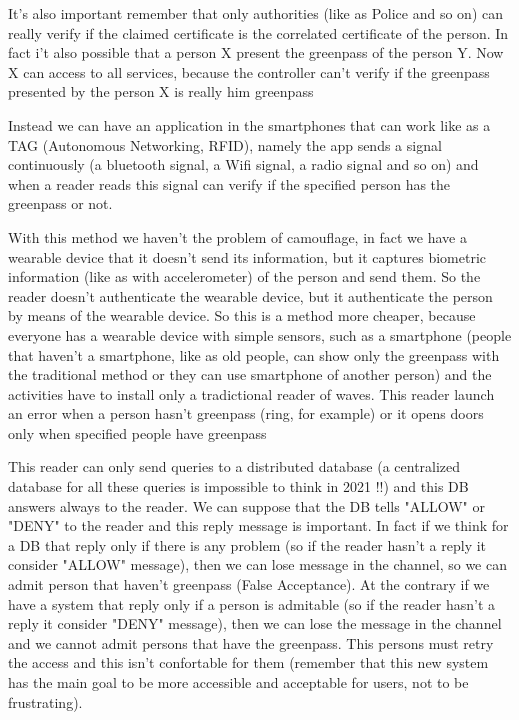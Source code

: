 \documentclass[12pt]{article}
\begin{document}
It's also important remember that only authorities (like as Police and so on) can really verify if the claimed certificate is the correlated certificate of the person. In fact i't also possible that a person X present the greenpass of the person Y. Now X can access to all services, because the controller can't verify if the greenpass presented by the person X is really him greenpass

Instead we can have an application in the smartphones that can work like as a TAG (Autonomous Networking, RFID), namely the app sends a signal continuously (a bluetooth signal, a Wifi signal, a radio signal and so on) and when a reader reads this signal can verify if the specified person has the greenpass or not.

With this method we haven't the problem of camouflage, in fact we have a wearable device that it doesn't send its information, but it captures biometric information (like as with accelerometer) of the person and send them. So the reader doesn't authenticate the wearable device, but it authenticate the person by means of the wearable device. So this is a method more cheaper, because everyone has a wearable device with simple sensors, such as a smartphone (people that haven't a smartphone, like as old people, can show only the greenpass with the traditional method or they can use smartphone of another person) and the activities have to install only a tradictional reader of waves. This reader launch an error when a person hasn't greenpass (ring, for example) or it opens doors only when specified people have greenpass

This reader can only send queries to a distributed database (a centralized database for all these queries is impossible to think in 2021 !!) and this DB answers always to the reader. We can suppose that the DB tells "ALLOW" or "DENY" to the reader and this reply message is important. In fact if we think for a DB that reply only if there is any problem (so if the reader hasn't a reply it consider "ALLOW" message), then we can lose message in the channel, so we can admit person that haven't greenpass (False Acceptance). At the contrary if we have a system that reply only if a person is admitable (so if the reader hasn't a reply it consider "DENY" message), then we can lose the message in the channel and we cannot admit persons that have the greenpass. This persons must retry the access and this isn't confortable for them (remember that this new system has the main goal to be more accessible and acceptable for users, not to be frustrating).
\end{document}
